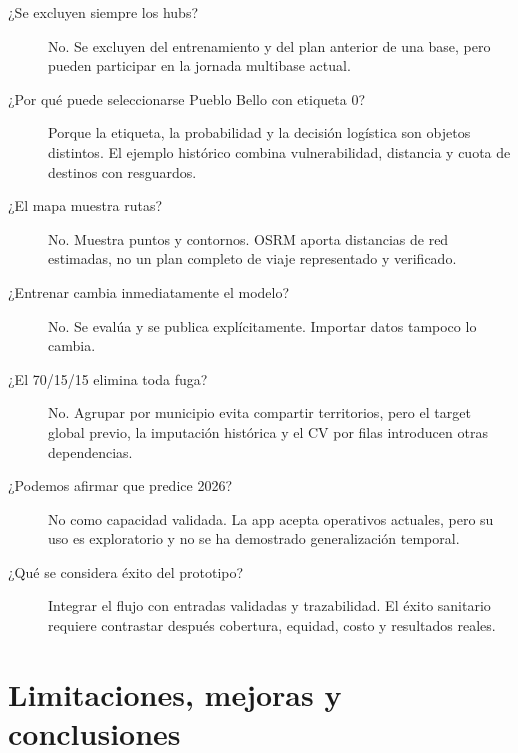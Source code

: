 \documentclass[11pt,a4paper]{report}
\begin{document}
\begin{description}
\item[¿Se excluyen siempre los hubs?] No. Se excluyen del entrenamiento y del plan anterior de una base, pero pueden participar en la jornada multibase actual.
\item[¿Por qué puede seleccionarse Pueblo Bello con etiqueta 0?] Porque la etiqueta, la probabilidad y la decisión logística son objetos distintos. El ejemplo histórico combina vulnerabilidad, distancia y cuota de destinos con resguardos.
\item[¿El mapa muestra rutas?] No. Muestra puntos y contornos. OSRM aporta distancias de red estimadas, no un plan completo de viaje representado y verificado.
\item[¿Entrenar cambia inmediatamente el modelo?] No. Se evalúa y se publica explícitamente. Importar datos tampoco lo cambia.
\item[¿El 70/15/15 elimina toda fuga?] No. Agrupar por municipio evita compartir territorios, pero el target global previo, la imputación histórica y el CV por filas introducen otras dependencias.
\item[¿Podemos afirmar que predice 2026?] No como capacidad validada. La app acepta operativos actuales, pero su uso es exploratorio y no se ha demostrado generalización temporal.
\item[¿Qué se considera éxito del prototipo?] Integrar el flujo con entradas validadas y trazabilidad. El éxito sanitario requiere contrastar después cobertura, equidad, costo y resultados reales.
\end{description}

\chapter{Limitaciones, mejoras y conclusiones}
\end{document}
